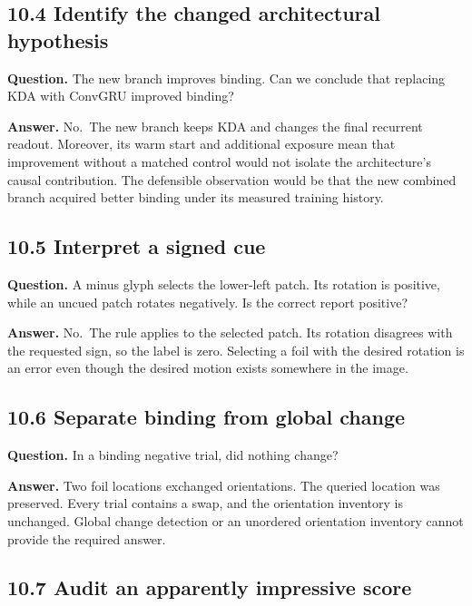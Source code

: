 \documentclass[
  11pt,
]{article}
\let\oldsubsection\subsection
\renewcommand{\subsection}{\Needspace{6\baselineskip}\oldsubsection}
\begin{document}
\subsection{10.4 Identify the changed architectural
hypothesis}\label{identify-the-changed-architectural-hypothesis}

\textbf{Question.} The new branch improves binding. Can we conclude that
replacing KDA with ConvGRU improved binding?

\textbf{Answer.} No.~The new branch keeps KDA and changes the final
recurrent readout. Moreover, its warm start and additional exposure mean
that improvement without a matched control would not isolate the
architecture's causal contribution. The defensible observation would be
that the new combined branch acquired better binding under its measured
training history.

\subsection{10.5 Interpret a signed cue}\label{interpret-a-signed-cue}

\textbf{Question.} A minus glyph selects the lower-left patch. Its
rotation is positive, while an uncued patch rotates negatively. Is the
correct report positive?

\textbf{Answer.} No.~The rule applies to the selected patch. Its
rotation disagrees with the requested sign, so the label is zero.
Selecting a foil with the desired rotation is an error even though the
desired motion exists somewhere in the image.

\subsection{10.6 Separate binding from global
change}\label{separate-binding-from-global-change}

\textbf{Question.} In a binding negative trial, did nothing change?

\textbf{Answer.} Two foil locations exchanged orientations. The queried
location was preserved. Every trial contains a swap, and the orientation
inventory is unchanged. Global change detection or an unordered
orientation inventory cannot provide the required answer.

\subsection{10.7 Audit an apparently impressive
score}\label{audit-an-apparently-impressive-score}
\end{document}
